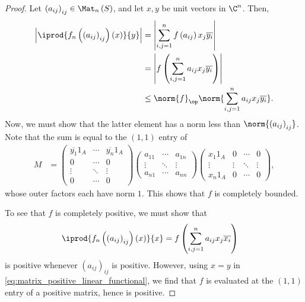\begin{proof}
  Let $\left( a_{ij} \right)_{ij}\in \Mat_n\left( S \right)$, and let $x,y$ be unit vectors in $\C^n$. Then,
  \begin{align*}
    \left\vert \iprod{f_n\left( \left( a_{ij} \right)_{ij} \right)\left( x \right)}{y} \right\vert &= \left\vert \sum_{i,j=1}^{n}f\left( a_{ij} \right)x_j\overline{y_i} \right\vert\\
                                                                                                   &= \left\vert f\left( \sum_{i,j=1}^{n} a_{ij}x_j \overline{y_i} \right) \right\vert\\
                                                                                                   &\leq \norm{f}_{\op}\norm{\sum_{i,j=1}^{n}a_{ij}x_j\overline{y_i}}.
  \end{align*}
  Now, we must show that the latter element has a norm less than $\norm{\left( a_{ij} \right)_{ij}}$. Note that the sum is equal to the $(1,1)$ entry of
  \begin{align*}
    M &= \begin{pmatrix}\overline{y_1}1_A & \cdots & \overline{y_n}1_A \\ 0 & \cdots & 0 \\ \vdots & \ddots & \vdots \\ 0 & \cdots & 0\end{pmatrix} \begin{pmatrix}a_{11} & \cdots & a_{1n} \\ \vdots & \ddots & \vdots \\ a_{n1} & \cdots & a_{nn}\end{pmatrix} \begin{pmatrix}x_1 1_A & 0 & \cdots & 0 \\ \vdots & \vdots & \ddots & \vdots \\ x_n1_A  & 0 & \cdots & 0\end{pmatrix},\label{eq:matrix_positive_linear_functional}\tag{\textasteriskcentered}
  \end{align*}
  whose outer factors each have norm $1$. This shows that $f$ is completely bounded.\newline

  To see that $f$ is completely positive, we must show that
  \begin{align*}
    \iprod{f_n\left( \left( a_{ij} \right)_{ij} \right)\left( x \right)}{x} &= f\left( \sum_{i,j=1}^{n}a_{ij}x_j\overline{x_i} \right)
  \end{align*}
  is positive whenever $\left( a_{ij} \right)_{ij}$ is positive. However, using $x = y$ in \eqref{eq:matrix_positive_linear_functional}, we find that $f$ is evaluated at the $(1,1)$ entry of a positive matrix, hence is positive.
\end{proof}
